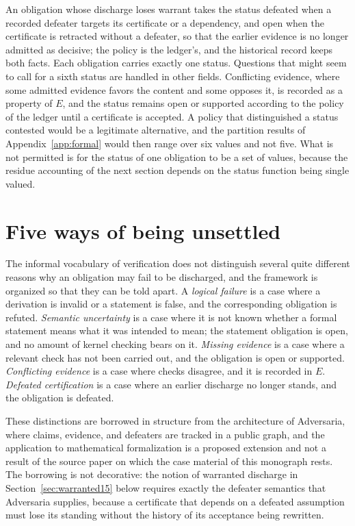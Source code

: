An obligation whose discharge loses warrant takes the status \textsf{defeated} when a recorded defeater targets its certificate or a dependency, and \textsf{open} when the certificate is retracted without a defeater, so that the earlier evidence is no longer admitted as decisive; the policy is the ledger's, and the historical record keeps both facts. Each obligation carries exactly one status. Questions that might seem to call for a sixth status are handled in other fields. Conflicting evidence, where some admitted evidence favors the content and some opposes it, is recorded as a property of $E$, and the status remains \textsf{open} or \textsf{supported} according to the policy of the ledger until a certificate is accepted. A policy that distinguished a status \textsf{contested} would be a legitimate alternative, and the partition results of Appendix~\ref{app:formal} would then range over six values and not five. What is not permitted is for the status of one obligation to be a set of values, because the residue accounting of the next section depends on the status function being single valued.

\section{Five ways of being unsettled}

The informal vocabulary of verification does not distinguish several quite different reasons why an obligation may fail to be discharged, and the framework is organized so that they can be told apart. A \emph{logical failure} is a case where a derivation is invalid or a statement is false, and the corresponding obligation is refuted. \emph{Semantic uncertainty} is a case where it is not known whether a formal statement means what it was intended to mean; the statement obligation is open, and no amount of kernel checking bears on it. \emph{Missing evidence} is a case where a relevant check has not been carried out, and the obligation is open or supported. \emph{Conflicting evidence} is a case where checks disagree, and it is recorded in $E$. \emph{Defeated certification} is a case where an earlier discharge no longer stands, and the obligation is defeated.

These distinctions are borrowed in structure from the architecture of Adversaria, where claims, evidence, and defeaters are tracked in a public graph, and the application to mathematical formalization is a proposed extension and not a result of the source paper on which the case material of this monograph rests. The borrowing is not decorative: the notion of warranted discharge in Section~\ref{sec:warranted15} below requires exactly the defeater semantics that Adversaria supplies, because a certificate that depends on a defeated assumption must lose its standing without the history of its acceptance being rewritten.

